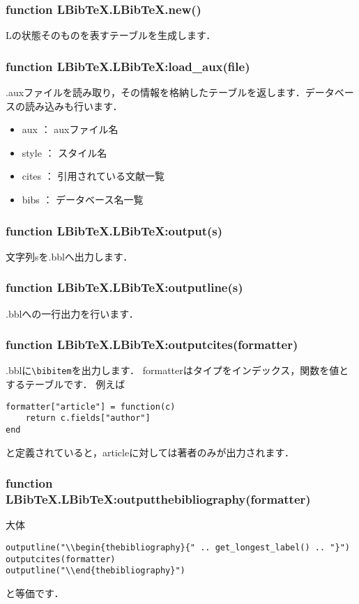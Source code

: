 \documentclass[dvipdfmx,a4paper]{jsarticle}
\DeclareRobustCommand{\LBibTeX}{L\BibTeX}
\begin{document}
\subsubsection{function LBibTeX.LBibTeX.new()}
\LBibTeX の状態そのものを表すテーブルを生成します．

\subsubsection{function LBibTeX.LBibTeX:load\_aux(file)}
.auxファイルを読み取り，その情報を格納したテーブルを返します．データベースの読み込みも行います．
\begin{itemize}
\item aux ： auxファイル名
\item style ： スタイル名
\item cites ： 引用されている文献一覧
\item bibs ： データベース名一覧
\end{itemize}

\subsubsection{function LBibTeX.LBibTeX:output(s)}
文字列sを.bblへ出力します．

\subsubsection{function LBibTeX.LBibTeX:outputline(s)}
.bblへの一行出力を行います．

\subsubsection{function LBibTeX.LBibTeX:outputcites(formatter)}
.bblに\verb|\bibitem|を出力します．
formatterはタイプをインデックス，関数を値とするテーブルです．
例えば
\begin{lstlisting}
formatter["article"] = function(c)
	return c.fields["author"]
end
\end{lstlisting}
と定義されていると，articleに対しては著者のみが出力されます．

\subsubsection{function LBibTeX.LBibTeX:outputthebibliography(formatter)}
大体
\begin{lstlisting}
outputline("\\begin{thebibliography}{" .. get_longest_label() .. "}")
outputcites(formatter)
outputline("\\end{thebibliography}")
\end{lstlisting}
と等価です．
\end{document}
